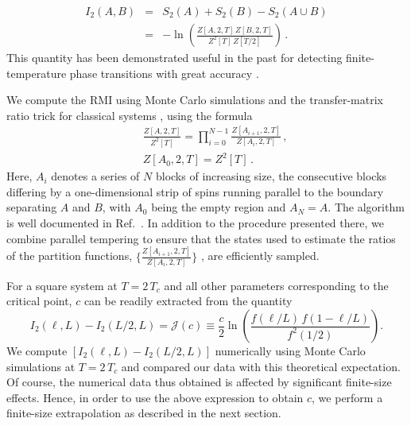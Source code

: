 \documentclass[a4paper,aps,prl,reprint,superscriptaddress,twocolumn,floatfix]{revtex4-1}
\begin{document}
\begin{eqnarray}
\label{rmi}
I_2 (A, B) &=& S_2 (A) + S_2 (B) - S_2 (A \cup B ) \nonumber \\
&=& -\ln \left (
\frac{  Z[ A,2, T] \,  Z[B, 2, T]
}
{  Z^2 [T] \,  Z[T/2] }
\right) \,.
\end{eqnarray}
This quantity has been demonstrated useful in the past for detecting finite-temperature phase transitions
with great accuracy \cite{Singh,stephen2013,WL}.





We compute the RMI using Monte Carlo simulations and the transfer-matrix ratio trick
for classical systems \cite{gelman1998,tommaso,graph-theory}, using the formula
\begin{eqnarray}
\label{ratio}
&& \frac{  Z [A,2, T] }   {  Z^2 [T] }
= \prod \limits_{i=0}^{N-1}  \frac{  Z [A_{ i+1 } ,2, T] }   {   Z [A_i ,2, T] } \,,\nonumber \\
&& Z [A_0 ,2, T]   = Z^2 [T] \,.
\end{eqnarray}
Here, $A_i$ 
denotes a series of $N$ blocks of increasing size, the consecutive blocks differing by a
one-dimensional strip of spins running parallel to the boundary separating $A$ and $B$, with $ A_0 $ being the empty region and $A_N = A$.
The algorithm is well documented in Ref.~\cite{stephan2014}.  In addition to the procedure presented there, we combine parallel tempering to ensure that the states used to estimate the ratios of the partition functions, $
\Big \lbrace \frac{  Z [A_{ i+1 } ,2, T] }   {   Z [A_i ,2, T] }  \Big \rbrace $ , are efficiently sampled.



For a square system at $T= 2 \, T_c $ and all other parameters corresponding to the critical point, $c$ can be readily extracted from the quantity
\begin{equation}
\label{c}
 I_2 (\ell, L) - I_2 (L/2 , L)
 =\mathcal{J} (c ) \equiv
\frac{c} {2}
\ln \left(
\frac {  f \left ( \ell / L \right )  \, f \left (1- {  \ell} /L  \right ) }
{  f^2 (1 /2) }
\right ) .
\end{equation}
We compute $ [  I_2 (\ell, L) - I_2 (L/2 , L) ]$ numerically using Monte Carlo simulations
at $T= 2 \, T_c $ and compared our data with this theoretical expectation. 
Of course, the numerical data thus obtained is affected by significant finite-size effects. Hence, in order
to use the above expression to obtain $c$, we perform a finite-size extrapolation as described in the next section.
\end{document}
